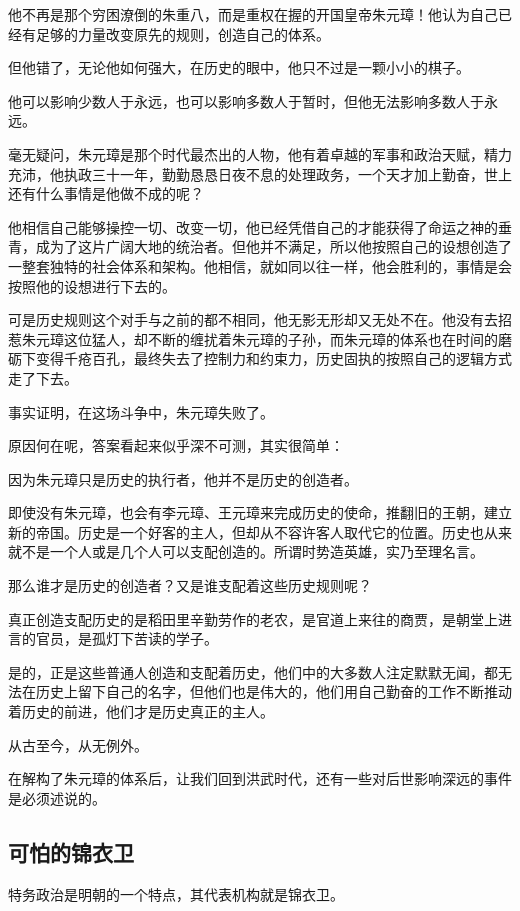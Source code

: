 \begin{multicols}{\theparacolNo}
		他不再是那个穷困潦倒的朱重八，而是重权在握的开国皇帝朱元璋！他认为自己已经有足够的力量改变原先的规则，创造自己的体系。

		但他错了，无论他如何强大，在历史的眼中，他只不过是一颗小小的棋子。

		他可以影响少数人于永远，也可以影响多数人于暂时，但他无法影响多数人于永远。

		毫无疑问，朱元璋是那个时代最杰出的人物，他有着卓越的军事和政治天赋，精力充沛，他执政三十一年，勤勤恳恳日夜不息的处理政务，一个天才加上勤奋，世上还有什么事情是他做不成的呢？

		他相信自己能够操控一切、改变一切，他已经凭借自己的才能获得了命运之神的垂青，成为了这片广阔大地的统治者。但他并不满足，所以他按照自己的设想创造了一整套独特的社会体系和架构。他相信，就如同以往一样，他会胜利的，事情是会按照他的设想进行下去的。

		可是历史规则这个对手与之前的都不相同，他无影无形却又无处不在。他没有去招惹朱元璋这位猛人，却不断的缠扰着朱元璋的子孙，而朱元璋的体系也在时间的磨砺下变得千疮百孔，最终失去了控制力和约束力，历史固执的按照自己的逻辑方式走了下去。

		事实证明，在这场斗争中，朱元璋失败了。

		原因何在呢，答案看起来似乎深不可测，其实很简单：

		因为朱元璋只是历史的执行者，他并不是历史的创造者。

		即使没有朱元璋，也会有李元璋、王元璋来完成历史的使命，推翻旧的王朝，建立新的帝国。历史是一个好客的主人，但却从不容许客人取代它的位置。历史也从来就不是一个人或是几个人可以支配创造的。所谓时势造英雄，实乃至理名言。

		那么谁才是历史的创造者？又是谁支配着这些历史规则呢？

		真正创造支配历史的是稻田里辛勤劳作的老农，是官道上来往的商贾，是朝堂上进言的官员，是孤灯下苦读的学子。

		是的，正是这些普通人创造和支配着历史，他们中的大多数人注定默默无闻，都无法在历史上留下自己的名字，但他们也是伟大的，他们用自己勤奋的工作不断推动着历史的前进，他们才是历史真正的主人。

		从古至今，从无例外。

		在解构了朱元璋的体系后，让我们回到洪武时代，还有一些对后世影响深远的事件是必须述说的。

		\subsection{可怕的锦衣卫}
		特务政治是明朝的一个特点，其代表机构就是锦衣卫。


\end{multicols}
